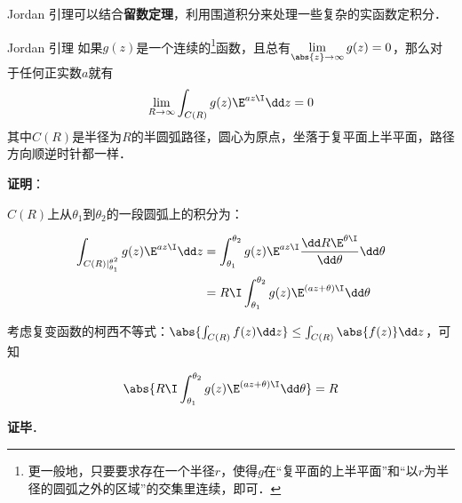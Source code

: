 

Jordan 引理可以结合\textbf{留数定理}，利用围道积分来处理一些复杂的实函数定积分．

\begin{theorem}{Jordan 引理}
如果$g(z)$是一个连续的\footnote{更一般地，只要要求存在一个半径$r$，使得$g$在“复平面的上半平面”和“以$r$为半径的圆弧之外的区域”的交集里连续，即可．}函数，且总有$\lim\limits_{\abs{z}\to\infty}g(z)=0$，那么对于任何正实数$a$就有
\begin{equation}
\lim\limits_{R\to \infty}\int_{C(R)}g(z)\E^{az\I}\dd z=0
\end{equation}
其中$C(R)$是半径为$R$的半圆弧路径，圆心为原点，坐落于复平面上半平面，路径方向顺逆时针都一样．


\end{theorem}

\textbf{证明}：

$C(R)$上从$\theta_1$到$\theta_2$的一段圆弧上的积分为：

\begin{equation}
\begin{aligned}
\int_{C(R)|_{\theta_1}^{\theta^2}}g(z)\E^{az\I}\dd z&=\int_{\theta_1}^{\theta_2}g(z)\E^{az\I}\frac{\dd R\E^{\theta\I}}{\dd \theta}\dd\theta\\
&=R\I\int_{\theta_1}^{\theta_2}g(z)\E^{(az+\theta)\I}\dd\theta
\end{aligned}
\end{equation}

考虑复变函数的柯西不等式：$\abs{\int_{C(R)}f(z)\dd z} \leq \int_{C(R)}\abs{f(z)}\dd z$，可知

\begin{equation}
\begin{aligned}
\abs{R\I\int_{\theta_1}^{\theta_2}g(z)\E^{(az+\theta)\I}\dd\theta}=R
\end{aligned}
\end{equation}

\textbf{证毕}．














